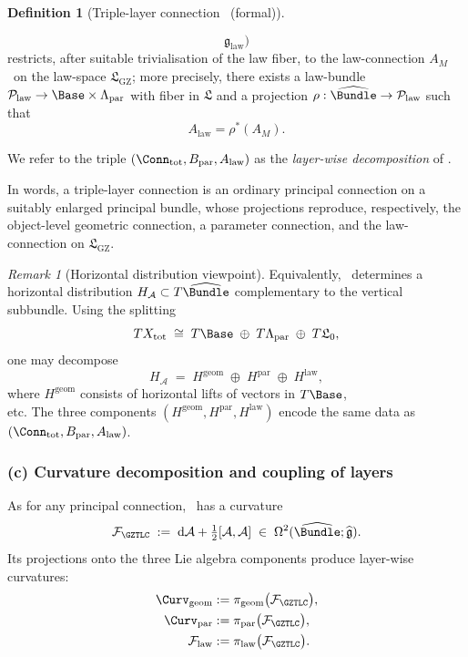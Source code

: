 \documentclass[11pt]{book}
\theoremstyle{plain}
\theoremstyle{definition}
\newtheorem{definition}[theorem]{Definition} \theoremstyle{remark}
\newtheorem{remark}[theorem]{Remark}
\newcommand{\GZLS}{\ensuremath{\mathfrak{L}_{\mathrm{GZ}}}}       \newcommand{\GZLT}{\ensuremath{M_{!w}}}                           \newcommand{\GZLOC}{\ensuremath{A_M}}                             \newcommand{\GZLCurv}{\ensuremath{\mathcal{F}_{\mathrm{law}}}}
\begin{document}
\begin{definition}[Triple-layer connection \GZTLC\ (formal)]
\begin{enumerate}[label=\roman*)]
\[                      \mathfrak{g}_{\mathrm{law}})
          \]
          restricts, after suitable trivialisation of the law fiber, to
          the law-connection \GZLOC\ on the law-space \GZLS; more
          precisely, there exists a law-bundle
          $\mathcal{P}_{\mathrm{law}}\to\Base\times\Lambda_{\mathrm{par}}$
          with fiber in $\mathfrak{L}$ and a projection
          $\rho:\widehat{\Bundle}\to\mathcal{P}_{\mathrm{law}}$
          such that
          \[
             A_{\mathrm{law}}=\rho^*(\GZLOC).
          \]
  \end{enumerate}
  We refer to the triple
  $(\Conn_{\mathrm{tot}},B_{\mathrm{par}},A_{\mathrm{law}})$ as the
  \emph{layer-wise decomposition} of \GZTLC.
\end{definition}

In words, a triple-layer connection is an ordinary principal connection
on a suitably enlarged principal bundle, whose projections reproduce,
respectively, the object-level geometric connection, a parameter
connection, and the law-connection on \GZLS.



\begin{remark}[Horizontal distribution viewpoint]
  Equivalently, \GZTLC\ determines a horizontal distribution
  $H_{\mathcal{A}}\subset T\widehat{\Bundle}$ complementary to the
  vertical subbundle. Using the splitting
  \[
      T X_{\mathrm{tot}}
      \;\cong\;
      T\Base
      \;\oplus\;
      T\Lambda_{\mathrm{par}}
      \;\oplus\;
      T\mathfrak{L}_0,
  \]
  one may decompose
  \[
      H_{\mathcal{A}}
      \;=\;
      H^{\mathrm{geom}}
      \;\oplus\;
      H^{\mathrm{par}}
      \;\oplus\;
      H^{\mathrm{law}},
  \]
  where $H^{\mathrm{geom}}$ consists of horizontal lifts of vectors in
  $T\Base$, \\ 
  etc. The three components $(H^{\mathrm{geom}},H^{\mathrm{par}},H^{\mathrm{law}})$ encode the
  same data as $(\Conn_{\mathrm{tot}},B_{\mathrm{par}},A_{\mathrm{law}})$.
\end{remark}



\subsubsection*{(c) Curvature decomposition and coupling of layers}

As for any principal connection, \GZTLC\ has a curvature
\[
   \mathcal{F}_{\GZTLC}
   \;:=\;
   \mathrm{d}\mathcal{A}
   + \tfrac12[\mathcal{A},\mathcal{A}]
   \;\in\;
   \Omega^2(\widehat{\Bundle};\widehat{\mathfrak{g}}).
\]
Its projections onto the three Lie algebra components produce
layer-wise curvatures:
\[
\begin{aligned}
   \Curv_{\mathrm{geom}}
   &:= \pi_{\mathrm{geom}}
       \bigl(\mathcal{F}_{\GZTLC}\bigr),\\
   \Curv_{\mathrm{par}}
   &:= \pi_{\mathrm{par}}
       \bigl(\mathcal{F}_{\GZTLC}\bigr),\\
   \GZLCurv
   &:= \pi_{\mathrm{law}}
       \bigl(\mathcal{F}_{\GZTLC}\bigr).
\end{aligned}
\]
\end{document}
